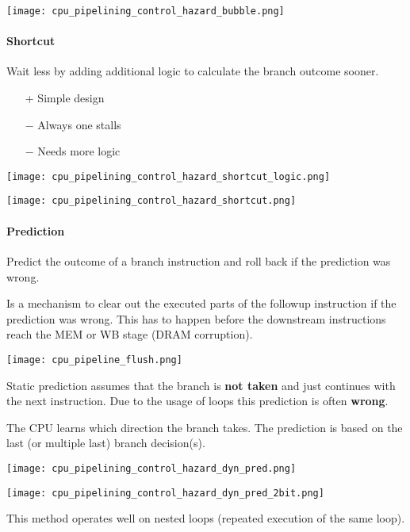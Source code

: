     \texttt{[image: cpu\_pipelining\_control\_hazard\_bubble.png]}

    \paragraph{Shortcut}\label{shortcut}

    Wait less by adding additional logic to calculate the branch outcome sooner.

    \begin{itemize}
        \item[+] Simple design
        \item[$-$] Always one stalls
        \item[$-$] Needs more logic
    \end{itemize}

    \texttt{[image: cpu\_pipelining\_control\_hazard\_shortcut\_logic.png]}

    \texttt{[image: cpu\_pipelining\_control\_hazard\_shortcut.png]}

    \paragraph{Prediction}\label{prediction}

    Predict the outcome of a branch instruction and roll back if the prediction was wrong.

    \newpar{}

    Is a mechanism to clear out the executed parts of the followup instruction if the prediction was wrong. This has to happen before the downstream instructions reach the MEM or WB stage (DRAM corruption).
    \begin{center}
        \texttt{[image: cpu\_pipeline\_flush.png]}
    \end{center}
    \newpar{}

    Static prediction assumes that the branch is \textbf{not taken} and just continues with the next instruction. Due to the usage of loops this prediction is often \textbf{wrong}.

    \newpar{}

    The CPU learns which direction the branch takes. The prediction is based on the last (or multiple last) branch decision(s). %
    \begin{center}
        \texttt{[image: cpu\_pipelining\_control\_hazard\_dyn\_pred.png]}
    \end{center}

    \newpar{}
    \begin{center}
        \texttt{[image: cpu\_pipelining\_control\_hazard\_dyn\_pred\_2bit.png]}
    \end{center}

    This method operates well on nested loops (repeated execution of the same loop).
